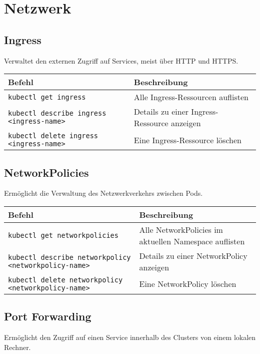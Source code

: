 \chapter{Netzwerk}

\section{Ingress}
Verwaltet den externen Zugriff auf Services, meist über HTTP und HTTPS. \\

\noindent
\begin{tabular}{|l|l|}
\hline
\textbf{Befehl} & \textbf{Beschreibung} \\
\hline
\texttt{kubectl get ingress} & Alle Ingress-Ressourcen auflisten \\
\texttt{kubectl describe ingress <ingress-name>} & Details zu einer Ingress-Ressource anzeigen \\
\texttt{kubectl delete ingress <ingress-name>} & Eine Ingress-Ressource löschen \\
\hline
\end{tabular}

\section{NetworkPolicies}
Ermöglicht die Verwaltung des Netzwerkverkehrs zwischen Pods.\\

\noindent
\begin{tabular}{|p{}|p{}|}
\hline
\textbf{Befehl} & \textbf{Beschreibung} \\
\hline
\texttt{kubectl get networkpolicies} & Alle NetworkPolicies im aktuellen Namespace auflisten \\
\texttt{kubectl describe networkpolicy <networkpolicy-name>} & Details zu einer NetworkPolicy anzeigen \\
\texttt{kubectl delete networkpolicy <networkpolicy-name>} & Eine NetworkPolicy löschen \\
\hline
\end{tabular}

\section{Port Forwarding}
Ermöglicht den Zugriff auf einen Service innerhalb des Clusters von einem lokalen Rechner.\\

